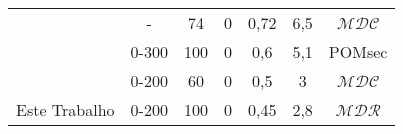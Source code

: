 \begin{table}
\begin{center}
\begin{sideways}
\begin{tabular}{|lcccccc|}
 \cite{miranda_castro1981} & - & 74 & 0 & 0,72 & 6,5 & $\mathcal{MDC}$ \vspace{0.1cm} \\
 \cite{soutelino2005}  & 0-300 & 100 & 0 & 0,6 & 5,1 & POMsec \vspace{0.1cm} \\
\cite{silveira_etal2006B}  & 0-200 & 60 & 0 & 0,5 & 3 & $\mathcal{MDC}$ \vspace{0.1cm} \\
Este Trabalho  & 0-200 & 100 & 0 & 0,45 & 2,8 & $\mathcal{MDR}$ \vspace{0.1cm} \\
\hline
\end{tabular}
\end{sideways}
\end{center}
\end{table}


